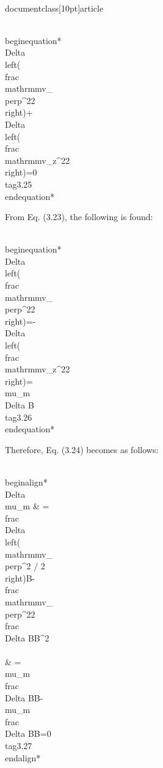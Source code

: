 \\documentclass[10pt]{article}
\begin{document}
\\begin{equation*}
\\Delta\\left(\\frac{\\mathrm{mv}_{\\perp}^{2}}{2}\\right)+\\Delta\\left(\\frac{\\mathrm{mv}_{z}^{2}}{2}\\right)=0 \\tag{3.25}
\\end{equation*}


From Eq. (3.23), the following is found:


\\begin{equation*}
\\Delta\\left(\\frac{\\mathrm{mv}_{\\perp}^{2}}{2}\\right)=-\\Delta\\left(\\frac{\\mathrm{mv}_{z}^{2}}{2}\\right)=\\mu_{m} \\Delta B \\tag{3.26}
\\end{equation*}


Therefore, Eq. (3.24) becomes as follows:


\\begin{align*}
\\Delta \\mu_{m} & =\\frac{\\Delta\\left(\\mathrm{mv}_{\\perp}^{2} / 2\\right)}{B}-\\frac{\\mathrm{mv}_{\\perp}^{2}}{2} \\frac{\\Delta B}{B^{2}} \\\\
& =\\mu_{m} \\frac{\\Delta B}{B}-\\mu_{m} \\frac{\\Delta B}{B}=0 \\tag{3.27}
\\end{align*}
\end{document}
